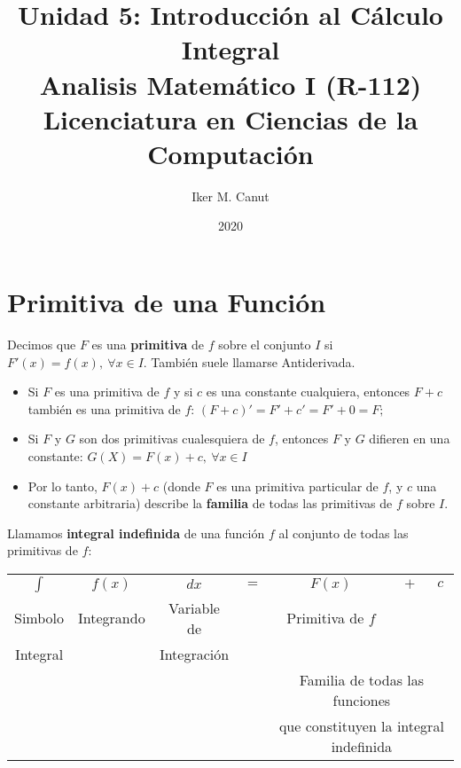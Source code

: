 \documentclass[11pt,a4paper]{article}
\author{Iker M. Canut}
\title{Unidad 5: Introducci\'on al C\'alculo Integral\\ Analisis Matem\'atico I (R-112)\\Licenciatura en Ciencias de la Computaci\'on}
\date{2020}
\begin{document}
\maketitle
\newpage

\section{Primitiva de una Funci\'on}
\noindent Decimos que $F$ es una \textbf{primitiva} de $f$ sobre el conjunto $I$ si $F'(x) = f(x),\ \forall x \in I$. Tambi\'en suele llamarse Antiderivada.

\begin{itemize}
\item Si $F$ es una primitiva de $f$ y si $c$ es una constante cualquiera, entonces $F+c$ tambi\'en es una primitiva de $f$: $(F+c)' = F'+c' = F'+0 = F;$
\item Si $F$ y $G$ son dos primitivas cualesquiera de $f$, entonces $F$ y $G$ difieren en una constante: $G(X)=F(x)+c,\ \forall x \in I$
\item Por lo tanto, $F(x)+c$ (donde $F$ es una primitiva particular de $f$, y $c$ una constante arbitraria) describe la \textbf{familia} de todas las primitivas de $f$ sobre $I$.
\end{itemize}

\noindent Llamamos \textbf{integral indefinida} de una funci\'on $f$ al conjunto de todas las primitivas de $f$: 

\begin{table}[h]
\centering
\begin{tabular}{ccccccc}
$\int$ & $f(x)$ & $dx$ & $=$ & $F(x)$ & $+$ & $c$\\
Simbolo & Integrando & Variable de  && Primitiva de $f$ & & \\
Integral & & Integraci\'on & & \multicolumn{3}{|c|}{}\\
\cline{5-7}
& & & & \multicolumn{3}{c}{Familia de todas las funciones}\\
& & & & \multicolumn{3}{c}{que constituyen la integral indefinida}\\
\end{tabular}
\end{table}
\end{document}
